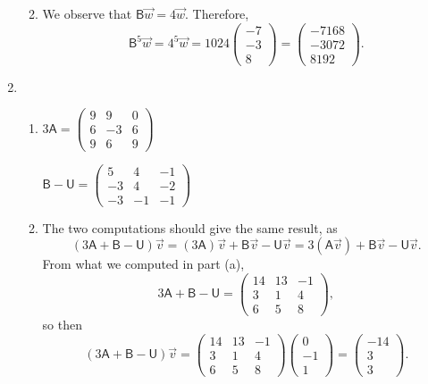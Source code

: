 \begin{enumerate}
\begin{enumerate}
\begin{equation*}
\end{equation*}
\item We observe that $\mathsf{B}\vec{w} = 4\vec{w}$. Therefore,
\begin{equation*}
\mathsf{B}^5\vec{w} = 4^5\vec{w} = 1024\begin{pmatrix} -7 \\ -3 \\ 8 \end{pmatrix} = \begin{pmatrix} -7168 \\ -3072 \\ 8192 \end{pmatrix}.
\end{equation*}
\end{enumerate}
\item \begin{enumerate}
\item \begin{multicols}{2}
$3\mathsf{A} = \begin{pmatrix} 9 & 9 & 0 \\ 6 & -3 & 6 \\ 9 & 6 & 9 \end{pmatrix}$\par
$\mathsf{B} - \mathsf{U} = \begin{pmatrix} 5 & 4 & -1 \\ -3 & 4 & -2 \\ -3 & -1 & -1 \end{pmatrix}$
\end{multicols}
\item The two computations should give the same result, as
\begin{equation*}
(3\mathsf{A} + \mathsf{B} - \mathsf{U})\vec{v} = (3\mathsf{A})\vec{v} + \mathsf{B}\vec{v} - \mathsf{U}\vec{v} = 3(\mathsf{A}\vec{v}) + \mathsf{B}\vec{v} - \mathsf{U}\vec{v}.
\end{equation*}
From what we computed in part (a),
\begin{equation*}
3\mathsf{A} + \mathsf{B} - \mathsf{U} = \begin{pmatrix} 14 & 13 & -1 \\ 3 & 1 & 4 \\ 6 & 5 & 8 \end{pmatrix},
\end{equation*}
so then
\begin{equation*}
(3\mathsf{A} + \mathsf{B} - \mathsf{U})\vec{v} = \begin{pmatrix} 14 & 13 & -1 \\ 3 & 1 & 4 \\ 6 & 5 & 8 \end{pmatrix}\begin{pmatrix} 0 \\ -1 \\ 1 \end{pmatrix} = \begin{pmatrix} -14 \\ 3 \\ 3 \end{pmatrix}.

\end{equation*}
\end{enumerate}
\end{enumerate}
